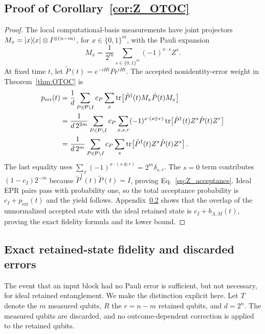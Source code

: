 \documentclass[onecolumn,prx,longbibliography,nofootinbib, superscriptaddress]{revtex4-2}
\theoremstyle{recap}
\begin{document}
\subsection{Proof of Corollary~\ref{cor:Z_OTOC}}\label{appendix:Z_OTOC}
\begin{proof}
The local computational-basis measurements have joint projectors $M_x=\ketbra{x}{x}\otimes I^{\otimes(n-m)}$, for $x\in\{0,1\}^m$, with the Pauli expansion
\begin{equation}
    M_x=\frac{1}{2^m}\sum_{s\in\{0,1\}^m}(-1)^{x\cdot s}Z^s.
\end{equation}
At fixed time $t$, let $\tilde{P}(t)=e^{-iHt}Pe^{iHt}$. The accepted nonidentity-error weight in Theorem~\ref{thm:OTOC} is
\begin{equation}
\begin{split}
    p_{\mathrm{err}}(t)
    &=\frac{1}{d}\sum_{P\in\mathsf{P}\backslash I}c_P\sum_x
      \tr\!\left[\tilde{P}^{\dagger}(t)M_x\tilde{P}(t)M_x\right]\\
    &=\frac{1}{d\,2^{2m}}\sum_{P\in\mathsf{P}\backslash I}c_P
      \sum_{x,s,r}(-1)^{x\cdot(s\oplus r)}
      \tr\!\left[\tilde{P}^{\dagger}(t)Z^s\tilde{P}(t)Z^r\right]\\
    &=\frac{1}{d\,2^m}\sum_{P\in\mathsf{P}\backslash I}c_P\sum_s
      \tr\!\left[\tilde{P}^{\dagger}(t)Z^s\tilde{P}(t)Z^s\right].
\end{split}
\end{equation}
The last equality uses $\sum_x(-1)^{x\cdot(s\oplus r)}=2^m\delta_{s,r}$. The $s=0$ term contributes $(1-c_I)2^{-m}$ because $\tilde{P}^{\dagger}(t)\tilde{P}(t)=I$, proving Eq.~\eqref{eq:Z_acceptance}. Ideal EPR pairs pass with probability one, so the total acceptance probability is $c_I+p_{\mathrm{err}}(t)$ and the yield follows. Appendix~\ref{appendix:benign_errors} shows that the overlap of the unnormalized accepted state with the ideal retained state is $c_I+b_{\Lambda,M}(t)$, proving the exact fidelity formula and its lower bound.
\end{proof}

\subsection{Exact retained-state fidelity and discarded errors}\label{appendix:benign_errors}
The event that an input block had no Pauli error is sufficient, but not necessary, for ideal retained entanglement. We make the distinction explicit here. Let $T$ denote the $m$ measured qubits, $R$ the $r=n-m$ retained qubits, and $d=2^n$. The measured qubits are discarded, and no outcome-dependent correction is applied to the retained qubits.
\end{document}
